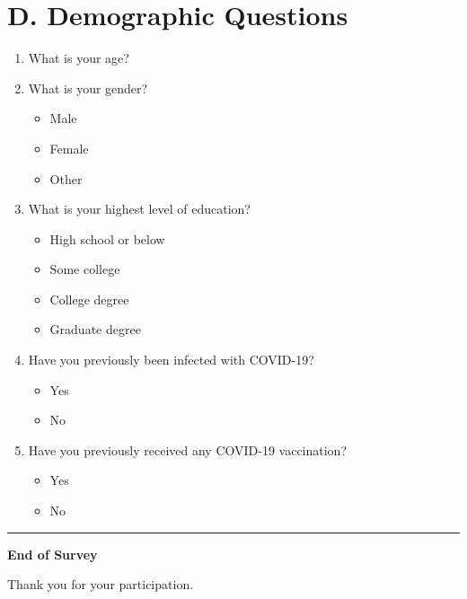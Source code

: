 \documentclass[12pt]{article}
\begin{document}
\section*{D. Demographic Questions}

\begin{enumerate}
    \item What is your age? \underline{\hspace{3cm}}
    \item What is your gender? 
    \begin{itemize}
        \item[$\square$] Male
        \item[$\square$] Female
        \item[$\square$] Other
    \end{itemize}
    \item What is your highest level of education?
    \begin{itemize}
        \item[$\square$] High school or below
        \item[$\square$] Some college
        \item[$\square$] College degree
        \item[$\square$] Graduate degree
    \end{itemize}
    \item Have you previously been infected with COVID-19?
    \begin{itemize}
        \item[$\square$] Yes
        \item[$\square$] No
    \end{itemize}
    \item Have you previously received any COVID-19 vaccination?
    \begin{itemize}
        \item[$\square$] Yes
        \item[$\square$] No
    \end{itemize}
\end{enumerate}

\vspace{2em}
\noindent\rule{\textwidth}{0.4pt}
\vspace{1em}

\noindent\textbf{End of Survey}

\vspace{1em}
\noindent Thank you for your participation.
\end{document}
